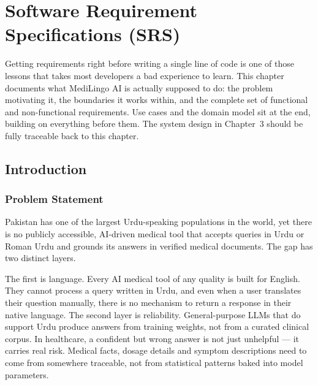 
\chapter{Software Requirement Specifications (SRS)}

Getting requirements right before writing a single line of code is one of those lessons
that takes most developers a bad experience to learn. This chapter documents what
MediLingo AI is actually supposed to do: the problem motivating it, the boundaries it works
within, and the complete set of functional and non-functional requirements. Use cases and
the domain model sit at the end, building on everything before them. The system design
in Chapter~3 should be fully traceable back to this chapter.

\section{Introduction}

\subsection{Problem Statement}

Pakistan has one of the largest Urdu-speaking populations in the world, yet there is no
publicly accessible, AI-driven medical tool that accepts queries in Urdu or Roman Urdu and
grounds its answers in verified medical documents. The gap has two distinct layers.

The first is language. Every AI medical tool of any quality is built for English. They
cannot process a query written in Urdu, and even when a user translates their question
manually, there is no mechanism to return a response in their native language. The second
layer is reliability. General-purpose LLMs that do support Urdu produce answers from
training weights, not from a curated clinical corpus. In healthcare, a confident but wrong
answer is not just unhelpful --- it carries real risk. Medical facts, dosage details and
symptom descriptions need to come from somewhere traceable, not from statistical patterns
baked into model parameters.

